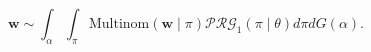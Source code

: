 \begin{equation}
    \label{model:cat}
    \bm{w} \sim \int_{\alpha}\int_{\pi}\text{Multinom}(\bm{w}\mid \pi)
                          \mathcal{PRG}_1(\pi\mid \theta)d\pi dG(\alpha).
\end{equation}
